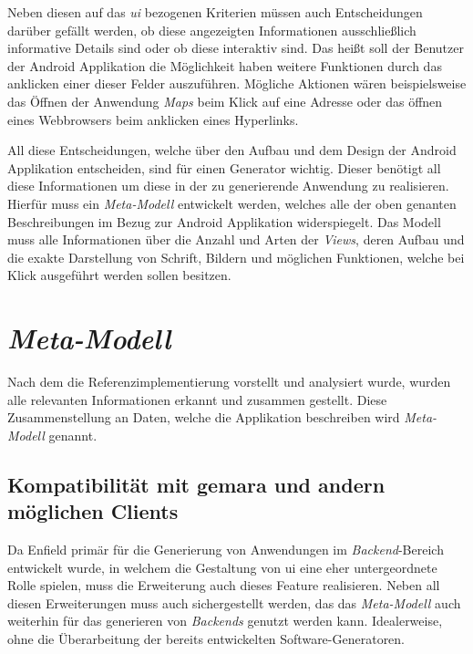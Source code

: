 Neben diesen auf das \textit{\acf{ui}} bezogenen Kriterien müssen auch Entscheidungen darüber gefällt werden, ob diese angezeigten Informationen ausschließlich informative Details sind oder ob diese interaktiv sind. Das heißt soll der Benutzer der Android Applikation die Möglichkeit haben weitere Funktionen durch das anklicken einer dieser Felder auszuführen. Mögliche Aktionen wären beispielsweise das Öffnen der Anwendung \textit{Maps} beim Klick auf eine Adresse oder das öffnen eines Webbrowsers beim anklicken eines Hyperlinks. 

All diese Entscheidungen, welche über den Aufbau und dem Design der Android Applikation entscheiden, sind für einen Generator wichtig. Dieser benötigt all diese Informationen um diese in der zu generierende Anwendung zu realisieren. Hierfür muss ein \textit{Meta-Modell} entwickelt werden, welches alle der oben genanten Beschreibungen im Bezug zur Android Applikation widerspiegelt. Das Modell muss alle Informationen über die Anzahl und Arten der \textit{Views}, deren Aufbau und die exakte Darstellung von Schrift, Bildern und möglichen Funktionen, welche bei Klick ausgeführt werden sollen besitzen.

\section{\textit{Meta-Modell}}
Nach dem die Referenzimplementierung vorstellt und analysiert  wurde, wurden alle relevanten Informationen erkannt und zusammen gestellt. Diese Zusammenstellung an Daten, welche die Applikation beschreiben wird \textit{Meta-Modell} genannt.

\subsection{Kompatibilität mit \acs{gemara} und andern möglichen Clients}
Da Enfield primär für die Generierung von Anwendungen im \textit{Backend}-Bereich entwickelt wurde, in welchem die Gestaltung von \acf{ui} eine eher untergeordnete Rolle spielen, muss die Erweiterung auch dieses Feature realisieren. Neben all diesen Erweiterungen muss auch sichergestellt werden, das das \textit{Meta-Modell} auch weiterhin für das generieren von \textit{Backends} genutzt werden kann. Idealerweise, ohne die Überarbeitung der bereits entwickelten Software-Generatoren. 

